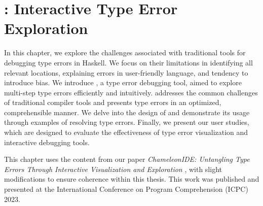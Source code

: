 \graphicspath{{Figures/Chameleon}}

\chapter{\chameleon{}: Interactive Type Error Exploration}


\label{chap:chameleon} 

In this chapter, we explore the challenges associated with traditional tools for debugging type errors in Haskell. We focus on their limitations in identifying all relevant locations, explaining errors in user-friendly language, and tendency to introduce bias. We introduce \chameleon{}, a type error debugging tool, aimed to explore multi-step type errors efficiently and intuitively. \chameleon{} addresses the common challenges of traditional compiler tools and presents type errors in an optimized, comprehensible manner. We delve into the design of \chameleon{} and demonstrate its usage through examples of resolving type errors. Finally, we present our user studies, which are designed to evaluate the effectiveness of type error visualization and interactive debugging tools.



 This chapter uses the content from our paper \textit{ChameleonIDE: Untangling Type Errors Through Interactive Visualization and
Exploration} \cite{Fu2023-fm}, with slight modifications to ensure coherence within this thesis. This work was published and presented at the International Conference on Program Comprehension (ICPC) 2023.







